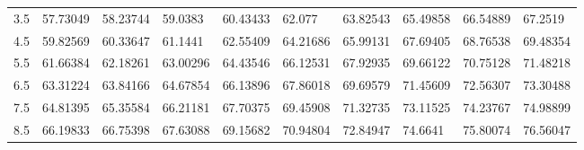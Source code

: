 \documentclass[10pt,twocolumn,letterpaper]{article}
\begin{document}
\begin{table}
\begin{tabular}{llllllllll}
    3.5             & 57.73049                               & 58.23744                               & 59.0383                                 & 60.43433                                & 62.077                                  & 63.82543                                & 65.49858                                & 66.54889                                & 67.2519                                 \\
    4.5             & 59.82569                               & 60.33647                               & 61.1441                                 & 62.55409                                & 64.21686                                & 65.99131                                & 67.69405                                & 68.76538                                & 69.48354                                \\
    5.5             & 61.66384                               & 62.18261                               & 63.00296                                & 64.43546                                & 66.12531                                & 67.92935                                & 69.66122                                & 70.75128                                & 71.48218                                \\
    6.5             & 63.31224                               & 63.84166                               & 64.67854                                & 66.13896                                & 67.86018                                & 69.69579                                & 71.45609                                & 72.56307                                & 73.30488                                \\
    7.5             & 64.81395                               & 65.35584                               & 66.21181                                & 67.70375                                & 69.45908                                & 71.32735                                & 73.11525                                & 74.23767                                & 74.98899                                \\
    8.5             & 66.19833                               & 66.75398                               & 67.63088                                & 69.15682                                & 70.94804                                & 72.84947                                & 74.6641                                 & 75.80074                                & 76.56047                                \\

\end{tabular}
\end{table}
\end{document}
